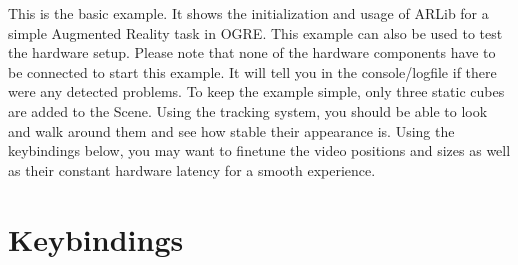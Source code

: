 \documentclass[]{article}
\begin{document}
This is the basic example. It shows the initialization and usage of
ARLib for a simple Augmented Reality task in OGRE. This example can also
be used to test the hardware setup. Please note that none of the
hardware components have to be connected to start this example. It will
tell you in the console/logfile if there were any detected problems. To
keep the example simple, only three static cubes are added to the Scene.
Using the tracking system, you should be able to look and walk around
them and see how stable their appearance is. Using the keybindings
below, you may want to finetune the video positions and sizes as well as
their constant hardware latency for a smooth experience.

\section{Keybindings}\label{keybindings-1}
\end{document}
